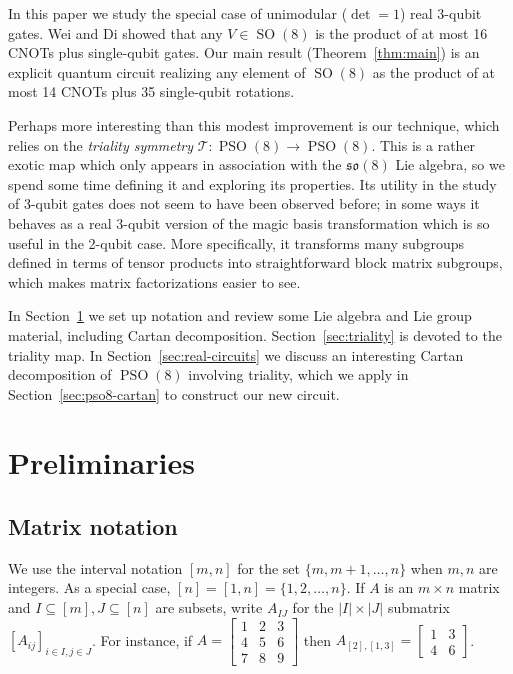 \documentclass[reqno]{amsart}
\theoremstyle{definition} \newtheorem{example}[theorem]{Example}
\newcommand{\SO}{\operatorname{SO}}
\newcommand{\PSO}{\operatorname{PSO}}
\newcommand{\so}{\mathfrak{so}}
\newcommand{\T}{\mathcal{T}}
\begin{document}
In this paper we study the special case of unimodular ($\det = 1$) real 3-qubit gates. Wei and Di \cite{wei-di} showed that any $V \in \SO(8)$ is the product of at most 16 CNOTs plus single-qubit gates. Our main result (Theorem~\ref{thm:main}) is an explicit quantum circuit realizing any element of $\SO(8)$ as the product of at most 14 CNOTs plus 35 single-qubit rotations.

Perhaps more interesting than this modest improvement is our technique, which relies on the \emph{triality symmetry} $\T : \PSO(8) \to \PSO(8)$.  This is a rather exotic map which only appears in association with the $\so(8)$ Lie algebra, so we spend some time defining it and exploring its properties.  Its utility in the study of 3-qubit gates does not seem to have been observed before; in some ways it behaves as a real 3-qubit version of the magic basis transformation which is so useful in the 2-qubit case. More specifically, it transforms many subgroups defined in terms of tensor products into straightforward block matrix subgroups, which makes matrix factorizations easier to see.

In Section~\ref{sec:prelim} we set up notation and review some Lie algebra and Lie group material, including Cartan decomposition. Section~\ref{sec:triality} is devoted to the triality map. In Section~\ref{sec:real-circuits} we discuss an interesting Cartan decomposition of $\PSO(8)$ involving triality, which we apply in Section~\ref{sec:pso8-cartan} to construct our new circuit.





\section{Preliminaries} \label{sec:prelim}
\subsection{Matrix notation}
We use the interval notation $[m,n]$ for the set $\{m,m{+}1,\ldots,n\}$ when $m,n$ are integers. As a special case, $[n] = [1,n] = \{1,2,\ldots,n\}$. If $A$ is an $m \times n$ matrix and $I \subseteq [m], J \subseteq [n]$ are subsets, write $A_{IJ}$ for the $|I| \times |J|$ submatrix $[A_{ij}]_{i \in I, j \in J}$.  For instance, if $A = \left[ \begin{smallmatrix} 1 & 2 & 3 \\ 4 & 5 & 6 \\ 7 & 8 & 9 \end{smallmatrix} \right]$ then $A_{[2], [1,3]} = \left[ \begin{smallmatrix} 1 & 3 \\ 4 & 6 \end{smallmatrix} \right]$. 
 
\end{document}
